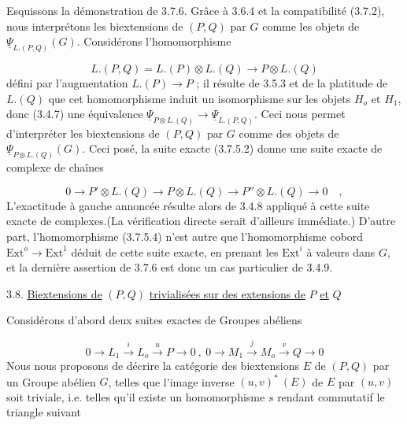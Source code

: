Esquissons la démonstration de 3.7.6. Grâce à 3.6.4 et la compatibilité (3.7.2), nous interprétons les biextensions de $(P,Q)$ par $G$ comme les objets de $\underline{\Psi}_{L.(P,Q)}(G)$. Considérons l'homomorphisme

\begin{equation*}
L.(P,Q)=L.(P) \otimes L.(Q) \longrightarrow P \otimes L.(Q)
\end{equation*}
défini par l'augmentation $L.(P) \longrightarrow P$ ; il résulte de 3.5.3 et de la platitude de $L.(Q)$ que cet homomorphisme induit un isomorphisme sur les objets $H_o$ et $H_1$, donc (3.4.7) une équivalence $\underline{\Psi}_{P \otimes L.(Q)} \longrightarrow \underline{\Psi}_{L.(P,Q)}$. Ceci nous permet d'interpréter les biextensions de $(P,Q)$ par $G$ comme des objets de $\underline{\Psi}_{P \otimes L.(Q)}(G)$. Ceci posé, la suite exacte (3.7.5.2) donne une suite exacte de complexe de chaînes

\begin{equation}\tag{3.7.6.1}
0 \longrightarrow P' \otimes L.(Q) \longrightarrow P \otimes L.(Q) \longrightarrow P'' \otimes L.(Q) \longrightarrow 0 \quad ,
\end{equation}
L'exactitude à gauche annoncée résulte alors de 3.4.8 appliqué à cette suite exacte de complexes.(La vérification directe serait d'ailleurs immédiate.) D'autre part, l'homomorphisme (3.7.5.4) n'est autre que l'homomorphisme cobord $\mathrm{Ext}^{o} \longrightarrow \mathrm{Ext}^{1}$ déduit de cette suite exacte, en prenant les $\mathrm{Ext}^{i}$ à valeurs dans $G$, et la dernière assertion de 3.7.6 est donc un cas particulier de 3.4.9.




3.8. \underline{Biextensions de} $(P,Q)$ \underline{trivialisées sur des extensions de} $P$ \underline{et} $Q$

Considérons d'abord deux suites exactes de Groupes abéliens

\begin{equation}\tag{3.8.1}
0 \longrightarrow L_1 \xrightarrow{\ i\ } L_o \xrightarrow{\ u\ } P \longrightarrow 0 \ , \ 0 \longrightarrow M_1 \xrightarrow{\ j\ } M_o \xrightarrow{\ v\ } Q \longrightarrow 0
\end{equation}
Nous nous proposons de décrire la catégorie des biextensions $E$ de $(P,Q)$ par un Groupe abélien $G$, telles que l'image inverse $(u,v)^{*}\ (E)$ de $E$ par $(u,v)$ soit triviale, i.e. telles qu'il existe un homomorphisme $s$ rendant commutatif le triangle suivant

